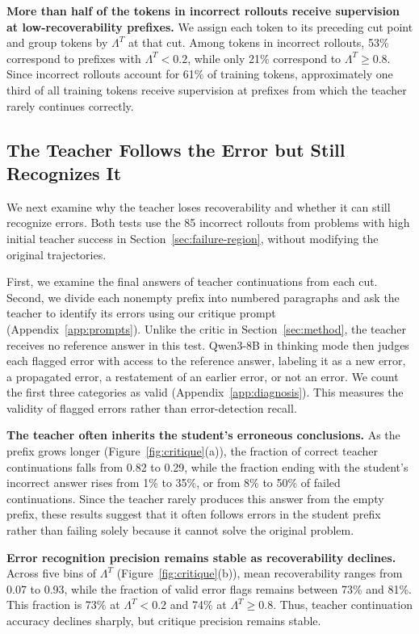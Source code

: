 \noindent\textbf{More than half of the tokens in incorrect rollouts receive supervision at low-recoverability prefixes.}
We assign each token to its preceding cut point and group tokens by $\Lambda^T$ at that cut. Among tokens in incorrect rollouts, 53\% correspond to prefixes with $\Lambda^T<0.2$, while only 21\% correspond to $\Lambda^T\geq0.8$. Since incorrect rollouts account for 61\% of training tokens, approximately one third of all training tokens receive supervision at prefixes from which the teacher rarely continues correctly.

\subsection{The Teacher Follows the Error but Still Recognizes It}
\label{sec:critique-ability}

We next examine why the teacher loses recoverability and whether it can still recognize errors. Both tests use the 85 incorrect rollouts from problems with high initial teacher success in Section~\ref{sec:failure-region}, without modifying the original trajectories.

First, we examine the final answers of teacher continuations from each cut. Second, we divide each nonempty prefix into numbered paragraphs and ask the teacher to identify its errors using our critique prompt (Appendix~\ref{app:prompts}). Unlike the critic in Section~\ref{sec:method}, the teacher receives no reference answer in this test. Qwen3-8B in thinking mode then judges each flagged error with access to the reference answer, labeling it as a new error, a propagated error, a restatement of an earlier error, or not an error. We count the first three categories as valid (Appendix~\ref{app:diagnosis}). This measures the validity of flagged errors rather than error-detection recall.

\noindent\textbf{The teacher often inherits the student's erroneous conclusions.}
As the prefix grows longer (Figure~\ref{fig:critique}(a)), the fraction of correct teacher continuations falls from 0.82 to 0.29, while the fraction ending with the student's incorrect answer rises from 1\% to 35\%, or from 8\% to 50\% of failed continuations. Since the teacher rarely produces this answer from the empty prefix, these results suggest that it often follows errors in the student prefix rather than failing solely because it cannot solve the original problem.

\noindent\textbf{Error recognition precision remains stable as recoverability declines.}
Across five bins of $\Lambda^T$ (Figure~\ref{fig:critique}(b)), mean recoverability ranges from 0.07 to 0.93, while the fraction of valid error flags remains between 73\% and 81\%. This fraction is 73\% at $\Lambda^T<0.2$ and 74\% at $\Lambda^T\geq0.8$. Thus, teacher continuation accuracy declines sharply, but critique precision remains stable.

